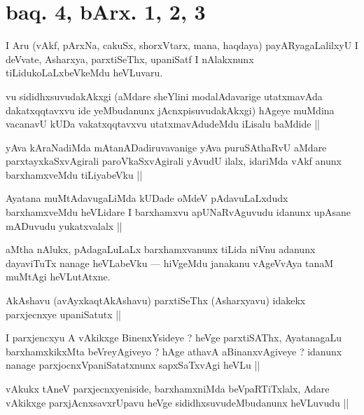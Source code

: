 \section*{baq. 4, bArx. 1, 2, 3}

\begin{artha}
I Aru (vAkf, pArxNa, cakuSx, shorxVtarx, mana, haqdaya) payARyagaLalilxyU I deVvate, Asharxya, parxtiSeThx, upaniSatf I nAlakxnunx tiLidukoLaLxbeVkeMdu heVLuvaru.
\end{artha}

\begin{artha}
vu sididhxsuvudakAkxgi (aMdare sheYlini modalAdavarige utatxmavAda dakatxqqtavxvu ide yeMbudanunx jAcnxpisuvudakAkxgi) hAgeye muMdina vacanavU kUDa vakatxqqtavxvu utatxmavAdudeMdu iLisalu baMdide ||
\end{artha}

\begin{artha}
yAva kAraNadiMda mAtanADadiruvavanige yAva puruSAthaRvU aMdare parxtayxkaSxvAgirali paroVkaSxvAgirali yAvudU ilalx, idariMda vAkf anunx barxhamxveMdu tiLiyabeVku ||
\end{artha}

\begin{artha}
Ayatana muMtAdavugaLiMda kUDade oMdeV pAdavuLaLxdudx barxhamxveMdu heVLidare I barxhamxvu apUNaRvAguvudu idanunx upAsane mADuvudu yukatxvalalx ||
\end{artha}

\begin{artha}
aMtha nAlukx, pAdagaLuLaLx barxhamxvanunx tiLida niVnu adanunx dayaviTuTx nanage heVLabeVku --- hiVgeMdu janakanu vAgeVvAya tanaM muMtAgi heVLutAtxne.
\end{artha}

\begin{artha}
AkAshavu (avAyxkaqtAkAshavu) parxtiSeThx (Asharxyavu) idakekx parxjecnxye upaniSatutx ||
\end{artha}


\begin{artha}
I parxjencxyu A vAkikxge BinenxYsideye ? heVge parxtiSAThx, AyatanagaLu barxhamxkikxMta beVreyAgiveyo ? hAge athavA aBinanxvAgiveye ? idanunx nanage parxjocnxVpaniSatatxnunx sapxSaTxvAgi heVLu ||
\end{artha}


\begin{artha}
vAkukx tAneV parxjecnxyeniside, barxhamxniMda beVpaRTiTxlalx, Adare vAkikxge parxjAcnxsavxrUpavu heVge sididhxsuvudeMbudanunx heVLuvudu ||
\end{artha}

